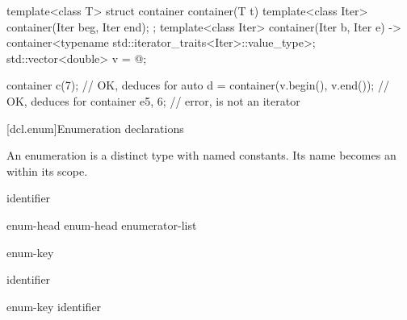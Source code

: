 \pnum
\begin{example}
\begin{codeblock}
template<class T> struct container {
    container(T t) {}
    template<class Iter> container(Iter beg, Iter end);
};
template<class Iter>
container(Iter b, Iter e) -> container<typename std::iterator_traits<Iter>::value_type>;
std::vector<double> v = { @\commentellip@ };

container c(7);                         // OK, deduces  for 
auto d = container(v.begin(), v.end()); // OK, deduces  for 
container e{5, 6};                      // error,  is not an iterator
\end{codeblock}
\end{example}
%

[dcl.enum]{Enumeration declarations}%
%
%

\pnum
An enumeration is a distinct type with named
constants. Its name becomes an  within its scope.

\begin{bnf}
\br
    identifier
\end{bnf}

\begin{bnf}
\br
    enum-head \terminal{\{}  \terminal{\}}\br
    enum-head \terminal{\{} enumerator-list \terminal{, \}}
\end{bnf}

\begin{bnf}
\br
    enum-key   
\end{bnf}

\begin{bnf}
\br
     identifier
\end{bnf}

\begin{bnf}
\br
    enum-key   identifier  \terminal{;}
\end{bnf}

\begin{bnf}
\br
    \br
    \br
\end{bnf}

